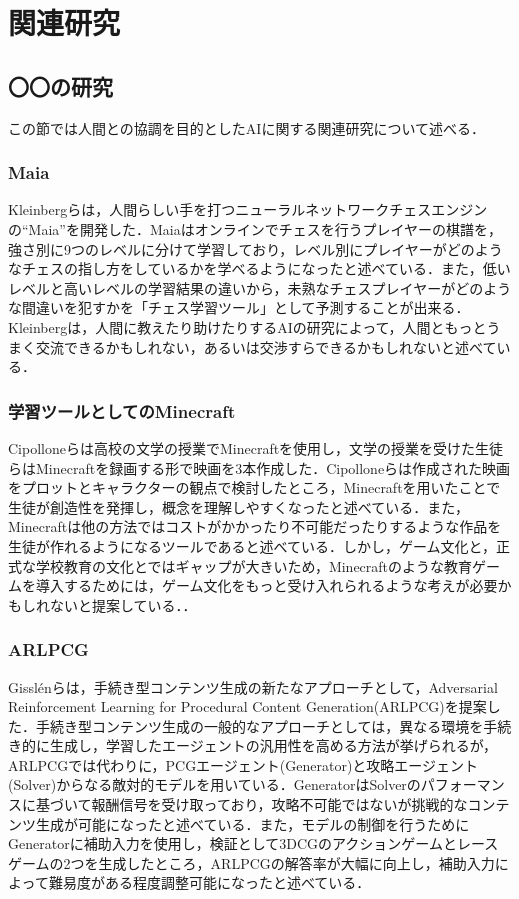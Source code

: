 \chapter{関連研究}	%
\thispagestyle{plain}   %


\section{〇〇の研究}
この節では人間との協調を目的としたAIに関する関連研究について述べる．

\subsection{Maia}
Kleinbergらは，人間らしい手を打つニューラルネットワークチェスエンジンの“Maia”を開発した．Maiaはオンラインでチェスを行うプレイヤーの棋譜を，強さ別に9つのレベルに分けて学習しており，レベル別にプレイヤーがどのようなチェスの指し方をしているかを学べるようになったと述べている．また，低いレベルと高いレベルの学習結果の違いから，未熟なチェスプレイヤーがどのような間違いを犯すかを「チェス学習ツール」として予測することが出来る．Kleinbergは，人間に教えたり助けたりするAIの研究によって，人間ともっとうまく交流できるかもしれない，あるいは交渉すらできるかもしれないと述べている．

\subsection{学習ツールとしてのMinecraft}
Cipolloneらは高校の文学の授業でMinecraftを使用し，文学の授業を受けた生徒らはMinecraftを録画する形で映画を3本作成した．Cipolloneらは作成された映画をプロットとキャラクターの観点で検討したところ，Minecraftを用いたことで生徒が創造性を発揮し，概念を理解しやすくなったと述べている．また，Minecraftは他の方法ではコストがかかったり不可能だったりするような作品を生徒が作れるようになるツールであると述べている．しかし，ゲーム文化と，正式な学校教育の文化とではギャップが大きいため，Minecraftのような教育ゲームを導入するためには，ゲーム文化をもっと受け入れられるような考えが必要かもしれないと提案している．．

\subsection{ARLPCG}
Gisslénらは，手続き型コンテンツ生成の新たなアプローチとして，Adversarial Reinforcement Learning for Procedural Content Generation(ARLPCG)を提案した．手続き型コンテンツ生成の一般的なアプローチとしては，異なる環境を手続き的に生成し，学習したエージェントの汎用性を高める方法が挙げられるが，ARLPCGでは代わりに，PCGエージェント(Generator)と攻略エージェント(Solver)からなる敵対的モデルを用いている．GeneratorはSolverのパフォーマンスに基づいて報酬信号を受け取っており，攻略不可能ではないが挑戦的なコンテンツ生成が可能になったと述べている．また，モデルの制御を行うためにGeneratorに補助入力を使用し，検証として3DCGのアクションゲームとレースゲームの2つを生成したところ，ARLPCGの解答率が大幅に向上し，補助入力によって難易度がある程度調整可能になったと述べている．

